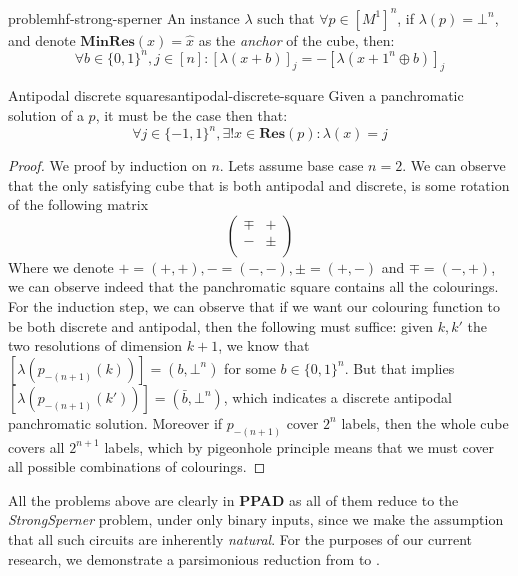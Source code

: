 \begin{definitionbox}{ problem}{hf-strong-sperner}
    An  instance $\lambda$ such that $\forall p \in [M^1]^n$, if $\lambda(p)= \bot^n$,
    and denote $\textbf{MinRes}(x) = \hat{x}$ as the \textit{anchor} of the cube, then:
    $$
        \forall b \in \{0,1\}^n, j \in [n]: [\lambda(x + b)]_j = -[\lambda(x + 1^n \oplus b)]_j
    $$
\end{definitionbox}


\begin{claimbox}{Antipodal discrete squares}{antipodal-discrete-square}
    Given a panchromatic solution of a  $p$, it must be the case then that:
    $$
        \forall j \in \{-1, 1\}^n, \exists! x \in \textbf{Res}(p): \lambda(x) =  j
    $$
\end{claimbox}

\begin{proof}
    We proof by induction on $n$. Lets assume base case $n = 2$. We can observe that the only satisfying
    cube that is both antipodal and discrete, is some rotation of the following matrix
    $$
        \begin{pmatrix}
            \mp & +   \\
            -   & \pm \\
        \end{pmatrix}
    $$
    Where we denote $+ = (+, +), -=(-,-), \pm = (+,-)$ and $\mp = (-,+)$, we can observe indeed that the panchromatic square contains all the colourings.
    For the induction step, we can observe that if we want our colouring function to be both discrete and antipodal, then the following must suffice:
    given $k, k'$ the two resolutions of dimension $k+1$, we know that $[\lambda(p_{-(n+1)}(k))] = (b, \bot^n)$ for some $b \in \{0,1\}^n$. But that implies
    $[\lambda(p_{-(n+1)}(k'))] = (\bar{b}, \bot^n)$, which indicates a discrete antipodal panchromatic solution. Moreover if $p_{-(n+1)}$ cover $2^n$ labels,
    then the whole cube covers all $2^{n+1}$ labels, which by pigeonhole principle means that we must cover all possible combinations of colourings.
\end{proof}

All the problems above are clearly in \textbf{PPAD} as all of them reduce to the \textit{StrongSperner} problem, under only
binary inputs, since we make the assumption that all such circuits are inherently \textit{natural}. For the purposes of our current
research, we demonstrate a parsimonious reduction from  to .


